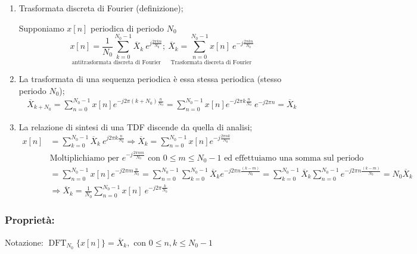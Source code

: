 \documentclass[
]{article}
\begin{document}
\begin{enumerate}
\def\labelenumi{\arabic{enumi}.}
\setcounter{enumi}{12}
\item
  Trasformata discreta di Fourier (definizione);

  Supponiamo \(x[n]\) periodica di periodo \(N_0\) \[
  \underset{\text{antitrasformata discreta di Fourier}}{x[n]=\frac{1}{N_0}\sum_{k=0}^{N_0 -1}\overline{X}_{k} \ e^{j\frac{2\pi kn}{N_0}}}; \
  \underset{\text{Trasformata discreta di Fourier}} {\overline{X}_k = \sum_{n=0}^{N_0 -1} x[n] \ e^{-j \frac{2\pi kn}{N_0}}}
  \]
\item
  La trasformata di una sequenza periodica è essa stessa periodica
  (stesso periodo \(N_0\)); \begin{gather*}
  \overline{X}_{k+N_0} = \sum_{n=0}^{N_0 -1} x[n] e^{-j2\pi(k+N_0)\frac{n}{N_0}} = \sum_{n=0}^{N_0 -1} x[n] e^{-j2\pi k\frac{n}{N_0}} \ e^{-j2\pi n} = \overline{X}_k
  \end{gather*}
\item
  La relazione di sintesi di una TDF discende da quella di analisi;
  \begin{align*}
  x[n] &= \sum_{k=0}^{N_0 -1} \overline{X}_k \ e^{j2\pi k \frac{n}{N_0}} \Rightarrow \overline{X}_k = \sum_{n=0}^{N_0 -1} x[n] e^{-j\frac{2\pi nk}{N_0}} \\
  &\text{Moltiplichiamo per } e^{-j \frac{2\pi nm}{N_0}} \text{ con } 0\leq m \leq N_0 - 1 \text{ ed effettuiamo una somma sul periodo} \\
  &=\sum_{n=0}^{N_0 -1} x[n] e^{-j2\pi m\frac{n}{N_0}} = \sum_{n=0}^{N_0 -1} \sum_{k=0}^{N_0 -1}\overline{X}_k e^{-j2\pi n\frac{(k-m)}{N_0}} = \sum_{k=0}^{N_0 -1}\overline{X}_k \sum_{n=0}^{N_0 -1} e^{-j2\pi n\frac{(k-m)}{N_0}} = N_0 \overline{X}_k \\
  &\Rightarrow \overline{X}_k = \frac{1}{N_0}\sum_{n=0}^{N_0 -1} x[n] \ e^{-j2\pi\frac{k}{N_0}}
  \end{align*}
\end{enumerate}

\subsubsection{Proprietà:}\label{proprietuxe0-1}

Notazione:
\(\operatorname{DFT}_{N_0}\Big\{x[n]\Big\} = \overline{X}_k, \text{ con } 0\leq n, k \leq N_0 -1\)
\end{document}
